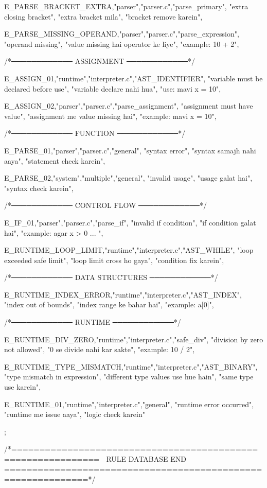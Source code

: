 \documentclass{article}
\begin{document}
{{E_PARSE_BRACKET_EXTRA,"parser","parser.c","parse_primary",
"extra closing bracket",
"extra bracket mila",
"bracket remove karein"},

{E_PARSE_MISSING_OPERAND,"parser","parser.c","parse_expression",
"operand missing",
"value missing hai operator ke liye",
"example: 10 + 2"},

/*──────────── ASSIGNMENT ────────────*/

{E_ASSIGN_01,"runtime","interpreter.c","AST_IDENTIFIER",
"variable must be declared before use",
"variable declare nahi hua",
"use: mavi x = 10"},

{E_ASSIGN_02,"parser","parser.c","parse_assignment",
"assignment must have value",
"assignment me value missing hai",
"example: mavi x = 10"},

/*──────────── FUNCTION ────────────*/

{E_PARSE_01,"parser","parser.c","general",
"syntax error",
"syntax samajh nahi aaya",
"statement check karein"},

{E_PARSE_02,"system","multiple","general",
"invalid usage",
"usage galat hai",
"syntax check karein"},

/*──────────── CONTROL FLOW ────────────*/

{E_IF_01,"parser","parser.c","parse_if",
"invalid if condition",
"if condition galat hai",
"example: agar x > 0 { ... }"},

{E_RUNTIME_LOOP_LIMIT,"runtime","interpreter.c","AST_WHILE",
"loop exceeded safe limit",
"loop limit cross ho gaya",
"condition fix karein"},

/*──────────── DATA STRUCTURES ────────────*/

{E_RUNTIME_INDEX_ERROR,"runtime","interpreter.c","AST_INDEX",
"index out of bounds",
"index range ke bahar hai",
"example: a[0]"},

/*──────────── RUNTIME ────────────*/

{E_RUNTIME_DIV_ZERO,"runtime","interpreter.c","safe_div",
"division by zero not allowed",
"0 se divide nahi kar sakte",
"example: 10 / 2"},

{E_RUNTIME_TYPE_MISMATCH,"runtime","interpreter.c","AST_BINARY",
"type mismatch in expression",
"different type values use hue hain",
"same type use karein"},

{E_RUNTIME_01,"runtime","interpreter.c","general",
"runtime error occurred",
"runtime me issue aaya",
"logic check karein"}

};

/*=============================================================
  🧠 RULE DATABASE END
=============================================================*/
\end{document}
